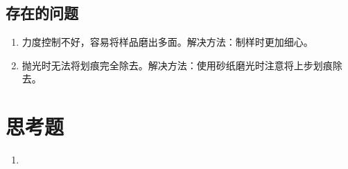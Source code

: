     \subsection{存在的问题}
    \begin{enumerate}
        \item 力度控制不好，容易将样品磨出多面。解决方法：制样时更加细心。
        \item 抛光时无法将划痕完全除去。解决方法：使用砂纸磨光时注意将上步划痕除去。
    \end{enumerate}
\section{思考题}
\begin{enumerate}
    \item {}
\end{enumerate}